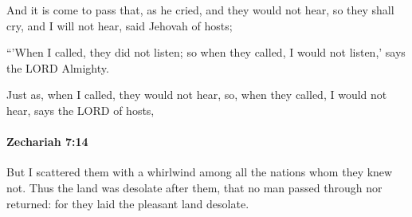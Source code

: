 			\begin{versebox}
					\item[BHS] 
					\item[LXX] 
					\item[ASV] And it is come to pass that, as he cried, and they would not hear, so they shall cry, and I will not hear, said Jehovah of hosts;
					\item[NIV] “’When I called, they did not listen; so when they called, I would not listen,’ says the LORD Almighty.
					\item[NRSV] Just as, when I called, they would not hear, so, when they called, I would not hear, says the LORD of hosts,
			\end{versebox}

		\paragraph{Zechariah 7:14} %
			\label{ZECHARIAH-7-14}

			But I scattered them with a whirlwind among all the nations whom they knew not. Thus the land was desolate after them, that no man passed through nor returned: for they laid the pleasant land desolate.

